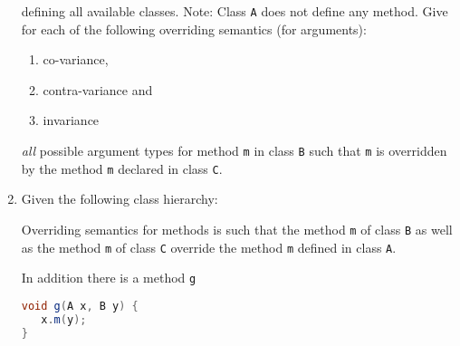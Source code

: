 \documentclass{article}
\newcommand{\comment}[1]{\marginpar{#1}}
\begin{document}
\begin{enumerate}
\begin{center}
\end{center}
defining all available classes. Note: Class \lstinline!A! does not
define any method.
Give for each of the following overriding semantics (for arguments):
\begin{enumerate}
  \item co-variance,
  \item contra-variance and
  \item invariance
\end{enumerate}
\emph{all} possible argument types for method \lstinline!m! in class
\lstinline!B! such that \lstinline!m! is overridden by the method
\lstinline!m! declared in class \lstinline!C!.  \comment{\textbf{3
    points}}
\item Given the following class hierarchy:\\

Overriding semantics for methods is such that the method \lstinline!m!
of class \lstinline!B! as well as the method \lstinline!m! of class
\lstinline!C! override the method \lstinline!m! defined in class
\lstinline!A!. 

In addition there is a method \lstinline!g! 
\begin{lstlisting}[language=Java, columns=flexible]
void g(A x, B y) {
   x.m(y);
}
\end{lstlisting}


\end{enumerate}
\end{document}
